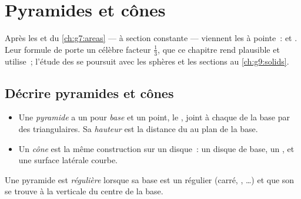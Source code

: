 \chapter{Pyramides et cônes}\label{ch:g8:solids}

Après les  et  du \cref{ch:g7:areas} ---  à
section constante --- viennent les  à pointe~:  et
. Leur formule de  porte un célèbre facteur $\frac13$, que
ce chapitre rend plausible et utilise~; l'étude des  se
poursuit avec les sphères et les sections au \cref{ch:g9:solids}.

\section{Décrire pyramides et cônes}

\begin{definition}\label{def:g8:solids:def}
\begin{itemize}
  \item Une \emph{pyramide} a un  pour
        \emph{base} et un point, le \emph{}, joint à chaque
         de la base par des  triangulaires. Sa
        \emph{hauteur} est la distance du  au plan de la base.
  \item Un \emph{cône} est la même construction sur un
        disque~: un disque de base, un , et une surface latérale
        courbe.
\end{itemize}
Une pyramide est \emph{régulière} lorsque sa base est un 
régulier (carré, , \dots) et que son  se
trouve à la verticale du centre de la base.
\end{definition}


